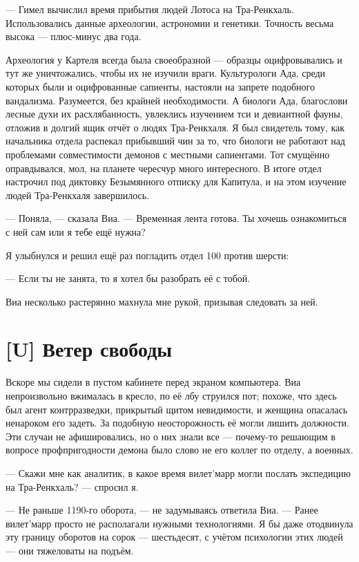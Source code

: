 --- Гимел вычислил время прибытия людей Лотоса на Тра-Ренкхаль.
Использовались данные археологии, астрономии и генетики.
Точность весьма высока --- плюс-минус два года.

Археология у Картеля всегда была своеобразной --- образцы оцифровывались и тут же уничтожались, чтобы их не изучили враги.
Культурологи Ада, среди которых были и оцифрованные сапиенты, настояли на запрете подобного вандализма.
Разумеется, без крайней необходимости.
А биологи Ада, благослови лесные духи их расхлябанность, увлеклись изучением тси и девиантной фауны, отложив в долгий ящик отчёт о людях Тра-Ренкхаля.
Я был свидетель тому, как начальника отдела распекал прибывший чин за то, что биологи не работают над проблемами совместимости демонов с местными сапиентами.
Тот смущённо оправдывался, мол, на планете чересчур много интересного.
В итоге отдел настрочил под диктовку Безымянного отписку для Капитула, и на этом изучение людей Тра-Ренкхаля завершилось.

--- Поняла, --- сказала Виа.
--- Временная лента готова.
Ты хочешь ознакомиться с ней сам или я тебе ещё нужна?

Я улыбнулся и решил ещё раз погладить отдел 100 против шерсти:

--- Если ты не занята, то я хотел бы разобрать её с тобой.

Виа несколько растерянно махнула мне рукой, призывая следовать за ней.

\section{[U] Ветер свободы}

Вскоре мы сидели в пустом кабинете перед экраном компьютера.
Виа непроизвольно вжималась в кресло, по её лбу струился пот;
похоже, что здесь был агент контрразведки, прикрытый щитом невидимости, и женщина опасалась ненароком его задеть.
За подобную неосторожность её могли лишить должности.
Эти случаи не афишировались, но о них знали все --- почему-то решающим в вопросе профпригодности демона было слово не его коллег по отделу, а военных.

--- Скажи мне как аналитик, в какое время вилет'марр могли послать экспедицию на Тра-Ренкхаль? --- спросил я.

--- Не раньше 1190-го оборота, --- не задумываясь ответила Виа.
--- Ранее вилет'марр просто не располагали нужными технологиями.
Я бы даже отодвинула эту границу оборотов на сорок --- шестьдесят, с учётом психологии этих людей --- они тяжеловаты на подъём.

